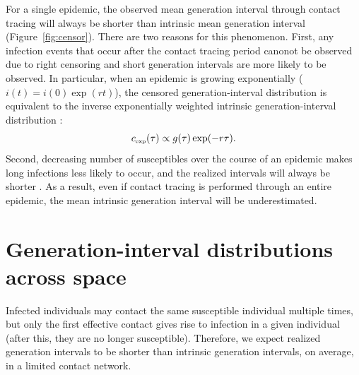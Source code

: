 \documentclass[12pt]{article}
\newcommand{\tsub}[2]{#1_{{\textrm{\tiny #2}}}}
\begin{document}
For a single epidemic, the observed mean generation interval through contact tracing will always be shorter than intrinsic mean generation interval (Figure~\ref{fig:censor}).
There are two reasons for this phenomenon.
First, any infection events that occur after the contact tracing period canonot be observed due to right censoring and short generation intervals are more likely to be observed.
In particular, when an epidemic is growing exponentially ($i(t) = i(0) \exp(rt)$), 
the censored generation-interval distribution is equivalent to the inverse exponentially weighted intrinsic generation-interval distribution \citep{britton2019estimation}:
\begin{equation}
\tsub{c}{exp}(\tau) \propto g(\tau) \exp(-r\tau).
\label{eq:exp}
\end{equation}
Second, decreasing number of susceptibles over the course of an epidemic makes long infections less likely to occur, and the realized intervals will always be shorter \citep{champredon2015intrinsic}.
As a result, even if contact tracing is performed through an entire epidemic, the mean intrinsic generation interval will be underestimated.


\section{Generation-interval distributions across space}

Infected individuals may contact the same susceptible individual multiple times, but only the first effective contact gives rise to infection in a given individual (after this, they are no longer susceptible).
Therefore, we expect realized generation intervals to be shorter than intrinsic generation intervals, on average, in a limited contact network.
\end{document}
